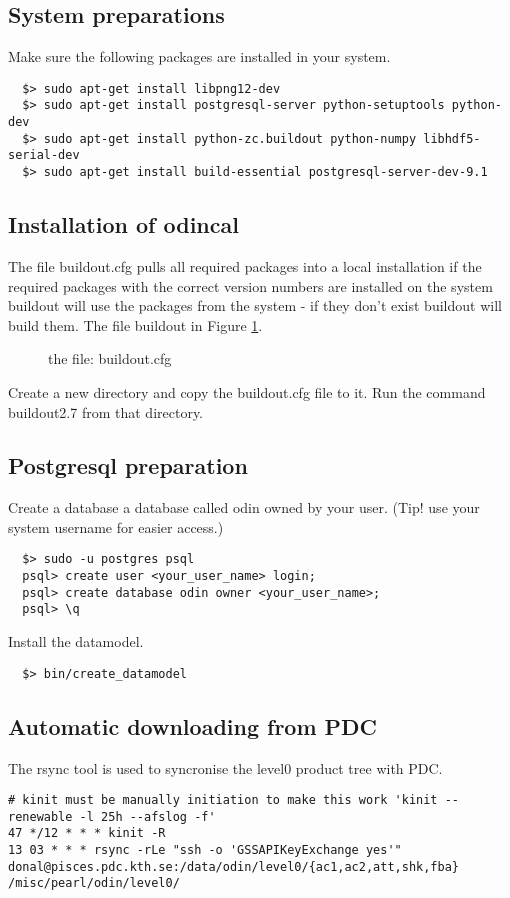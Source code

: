\subsection{System preparations}
Make sure the following packages are installed in your system.
\begin{verbatim}  
  $> sudo apt-get install libpng12-dev
  $> sudo apt-get install postgresql-server python-setuptools python-dev
  $> sudo apt-get install python-zc.buildout python-numpy libhdf5-serial-dev
  $> sudo apt-get install build-essential postgresql-server-dev-9.1
\end{verbatim}

\subsection{Installation of odincal}

The file buildout.cfg pulls all required packages into a local installation if the required packages with the correct version numbers are installed on the system buildout will use the packages from the system - if they don't exist buildout will build them. The file buildout in Figure \ref{buildout}.

\begin{figure}
\caption{the file: buildout.cfg}
\label{buildout}
\end{figure}

Create a new directory and copy the buildout.cfg file to it. Run the command buildout2.7 from that directory.


\subsection{Postgresql preparation}
Create a database a database called odin owned by your user. (Tip! use your system username for easier access.)
 
\begin{verbatim}  
  $> sudo -u postgres psql
  psql> create user <your_user_name> login;
  psql> create database odin owner <your_user_name>;
  psql> \q
\end{verbatim}

Install the datamodel.

\begin{verbatim}  
  $> bin/create_datamodel
\end{verbatim}

\subsection{Automatic downloading from PDC}
The rsync tool is used to syncronise the level0 product tree with PDC.
\begin{verbatim}
# kinit must be manually initiation to make this work 'kinit --renewable -l 25h --afslog -f'
47 */12 * * * kinit -R
13 03 * * * rsync -rLe "ssh -o 'GSSAPIKeyExchange yes'"  donal@pisces.pdc.kth.se:/data/odin/level0/{ac1,ac2,att,shk,fba} /misc/pearl/odin/level0/
\end{verbatim}
